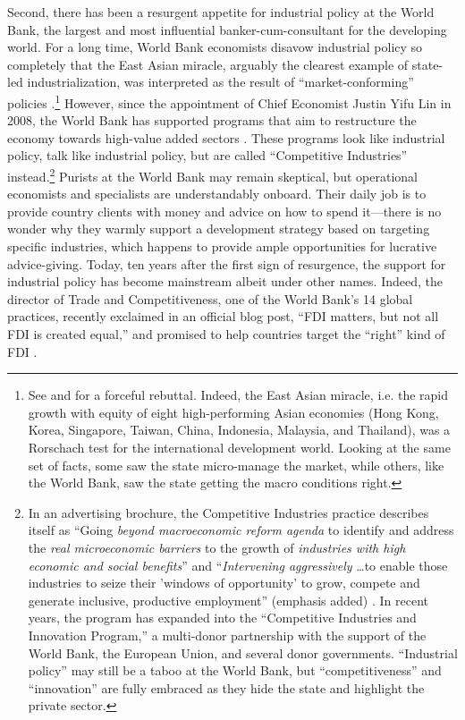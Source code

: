 Second, there has been a resurgent appetite for industrial policy at the World
Bank, the largest and most influential banker-cum-consultant for the developing
world. For a long time, World Bank economists disavow industrial policy so
completely that the East Asian miracle, arguably the clearest example of
state-led industrialization, was interpreted as the result of
``market-conforming'' policies \citep[355]{WorldBank1993}.\footnote{See
  \citet{Amsden1994} and \citet{Rodrik1994} for a forceful rebuttal. Indeed, the
  East Asian miracle, i.e. the rapid growth with equity of eight high-performing
  Asian economies (Hong Kong, Korea, Singapore, Taiwan, China, Indonesia,
  Malaysia, and Thailand), was a Rorschach test for the international
  development world. Looking at the same set of facts, some saw the state
  micro-manage the market, while others, like the World Bank, saw the state
  getting the macro conditions right.} However, since the appointment of Chief
Economist Justin Yifu Lin in 2008, the World Bank has supported programs that
aim to restructure the economy towards high-value added sectors
\citep{Wade2012}. These programs look like industrial policy, talk like
industrial policy, but are called ``Competitive Industries''
instead.\footnote{In an advertising brochure, the Competitive Industries
  practice describes itself as ``Going \textit{beyond macroeconomic reform
    agenda} to identify and address the \textit{real microeconomic barriers} to
  the growth of \textit{industries with high economic and social benefits}'' and
  ``\textit{Intervening aggressively} \ldots to enable those industries to seize
  their 'windows of opportunity' to grow, compete and generate inclusive,
  productive employment'' (emphasis added) \citep{WorldBank2011}. In recent
  years, the program has expanded into the ``Competitive Industries and
  Innovation Program,'' a multi-donor partnership with the support of the World
  Bank, the European Union, and several donor governments. ``Industrial policy''
  may still be a taboo at the World Bank, but ``competitiveness'' and
  ``innovation'' are fully embraced as they hide the state and highlight the
  private sector.} Purists at the World Bank may remain skeptical, but
operational economists and specialists are understandably onboard. Their daily
job is to provide country clients with money and advice on how to spend
it---there is no wonder why they warmly support a development strategy based on
targeting specific industries, which happens to provide ample opportunities for
lucrative advice-giving. Today, ten years after the first sign of resurgence,
the support for industrial policy has become mainstream albeit under other
names. Indeed, the director of Trade and Competitiveness, one of the World
Bank's 14 global practices, recently exclaimed in an official blog post, ``FDI
matters, but not all FDI is created equal,'' and promised to help countries
target the ``right'' kind of FDI \citep{Fruman2016}.


